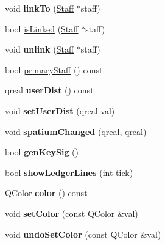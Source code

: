 \begin{DoxyCompactItemize}
\item 
\mbox{\label{class_ms_1_1_staff_a000cd734aa6489ec639e9243913b593b}} 
void {\bfseries link\+To} (\hyperlink{class_ms_1_1_staff}{Staff} $\ast$staff)
\item 
bool \hyperlink{class_ms_1_1_staff_a29b2740812d349e8a303926ea265c37c}{is\+Linked} (\hyperlink{class_ms_1_1_staff}{Staff} $\ast$staff)
\item 
\mbox{\label{class_ms_1_1_staff_a613259eb43c1fa302b253a69986826d7}} 
void {\bfseries unlink} (\hyperlink{class_ms_1_1_staff}{Staff} $\ast$staff)
\item 
bool \hyperlink{class_ms_1_1_staff_ab2b239f1f1d6f3498015a21270cc2d92}{primary\+Staff} () const
\item 
\mbox{\label{class_ms_1_1_staff_a26169d6fb7842f43590c53d3dd58fc66}} 
qreal {\bfseries user\+Dist} () const
\item 
\mbox{\label{class_ms_1_1_staff_a8b47da469b306ae9676c965c5b899a95}} 
void {\bfseries set\+User\+Dist} (qreal val)
\item 
\mbox{\label{class_ms_1_1_staff_aeaf0e2f45bfa1b5ed3e67b3b514ef387}} 
void {\bfseries spatium\+Changed} (qreal, qreal)
\item 
\mbox{\label{class_ms_1_1_staff_a446c9f20bdfeb1a147be6868e33a7864}} 
bool {\bfseries gen\+Key\+Sig} ()
\item 
\mbox{\label{class_ms_1_1_staff_acd608285ce4167d1abdebe52ab4cb03f}} 
bool {\bfseries show\+Ledger\+Lines} (int tick)
\item 
\mbox{\label{class_ms_1_1_staff_af3f054bc7cf548e33ca05cc5338d3bc3}} 
Q\+Color {\bfseries color} () const
\item 
\mbox{\label{class_ms_1_1_staff_a8268036e3b57aaa5f1859c6e6f190459}} 
void {\bfseries set\+Color} (const Q\+Color \&val)
\item 
\mbox{\label{class_ms_1_1_staff_afdbc4f399c97c061f4eb3396493dca13}} 
void {\bfseries undo\+Set\+Color} (const Q\+Color \&val)

\end{DoxyCompactItemize}

